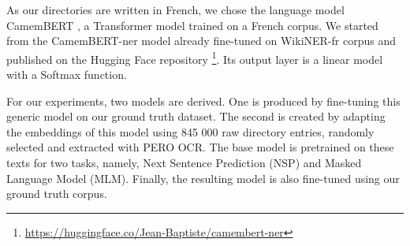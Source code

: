 As our directories are written in French, we chose the language model CamemBERT \cite{martin-etal-2020-camembert}, a Transformer model trained on a French corpus. We started from the CamemBERT-ner model already fine-tuned on WikiNER-fr corpus and published on the Hugging Face repository \footnote{\url{https://huggingface.co/Jean-Baptiste/camembert-ner}}. Its output layer is a linear model with a Softmax function.

For our experiments, two models are derived. One is produced by fine-tuning this generic model on our ground truth dataset.
The second is created by adapting the embeddings of this model using 845 000 raw directory entries, randomly selected and extracted with PERO OCR. The base model is pretrained on these texts for two tasks, namely, Next Sentence Prediction (NSP) and Masked Language Model (MLM). Finally, the resulting model is also fine-tuned using our ground truth corpus.


